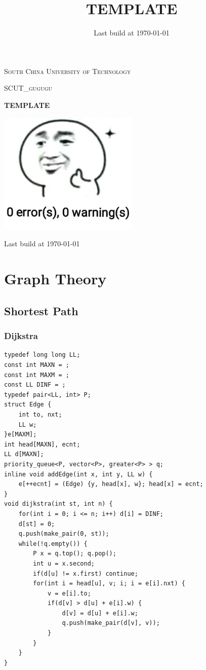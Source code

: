\documentclass[10pt]{ctexart}
\title{TEMPLATE}
\author{}
\date{Last build at \today}
\begin{document}
{
\begin{titlepage}
    \centering
    \vspace{2cm}
    {\scshape\Large South China University of Technology \par}
    \vspace{1cm}
    {\scshape\Large SCUT\_gugugu\par}
    \vspace{1.5cm}
    {\Huge\bfseries TEMPLATE\par}
    \vspace{4.5cm}
    \includegraphics[width=0.5\textwidth]{./LOGO}\par\vspace{1cm}

    \vfill

    {\large Last build at \today\par}

\thispagestyle{empty}
\end{titlepage}
\tableofcontents
\newpage
\section{Graph Theory}
\subsection{Shortest Path}
\subsubsection{Dijkstra}
\begin{lstlisting}
typedef long long LL;
const int MAXN = ;
const int MAXM = ;
const LL DINF = ;
typedef pair<LL, int> P;
struct Edge {
    int to, nxt;
    LL w;
}e[MAXM];
int head[MAXN], ecnt;
LL d[MAXN];
priority_queue<P, vector<P>, greater<P> > q;
inline void addEdge(int x, int y, LL w) {
    e[++ecnt] = (Edge) {y, head[x], w}; head[x] = ecnt;
}
void dijkstra(int st, int n) {
    for(int i = 0; i <= n; i++) d[i] = DINF;
    d[st] = 0;
    q.push(make_pair(0, st));
    while(!q.empty()) {
        P x = q.top(); q.pop();
        int u = x.second;
        if(d[u] != x.first) continue; 
        for(int i = head[u], v; i; i = e[i].nxt) {
            v = e[i].to;
            if(d[v] > d[u] + e[i].w) {
                d[v] = d[u] + e[i].w;
                q.push(make_pair(d[v], v));
            }
        }
    }
}
\end{lstlisting}
}
\end{document}
